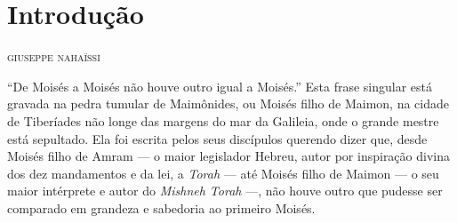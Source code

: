 %
%
%
%

\chapter{Introdução}

\begin{flushright}
\textsc{giuseppe nahaïssi}
\end{flushright}

\noindent{}``De Moisés a Moisés não houve outro igual a Moisés.'' Esta frase
singular está gravada na pedra tumular de Maimônides, ou Moisés filho
de Maimon, na cidade de Tiberíades não longe das margens do mar da
Galileia, onde o grande mestre está sepultado. Ela foi escrita pelos
seus discípulos querendo dizer que, desde Moisés filho de Amram --- o
maior legislador Hebreu, autor por inspiração divina dos dez mandamentos
e da lei, a \emph{Torah} --- até Moisés filho de Maimon --- o seu maior
intérprete e autor do \emph{Mishneh Torah} ---, não houve outro que
pudesse ser comparado em grandeza e sabedoria ao primeiro Moisés.


